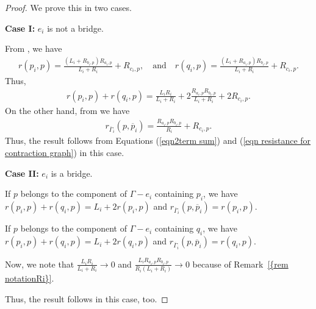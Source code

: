 \documentclass[12pt]{amsart}
\theoremstyle{example}
\theoremstyle{definition}
\theoremstyle{notation}
\begin{document}
\begin{proof}
We prove this in two cases.

\textbf{Case I:} $e_i$ is not a bridge.

From \cite[Section 2]{C4}, we have
\begin{equation}\label{eqn2term0}
\begin{split}
r(p_i,p)=\frac{({L_{i}}+R_{b_i,p})R_{a_i,p}}{{L_{i}}+{R_{i}}}+R_{c_i,p}, \quad
\text{and} \quad r(q_i,p)=\frac{({L_{i}}+R_{a_i,p})R_{b_i,p}}{{L_{i}}+{R_{i}}}+R_{c_i,p}.
\end{split}
\end{equation}
Thus,
\begin{equation}\label{eqn2term sum}
\begin{split}
r({p_{i}},p)+r({q_{i}},p) = \frac{{L_{i}} {R_{i}}}{{L_{i}}+{R_{i}}}+2 \frac{R_{a_i,p} R_{b_i,p}}{{L_{i}}+{R_{i}}}+2R_{c_i,p}.
\end{split}
\end{equation}
On the other hand, from \cite[Equation 17]{C7} we have
\begin{equation}\label{eqn resistance for contraction graph}
\begin{split}
r_{{{\overline{\Gamma}}}_i}(p,{\overline{p}_i}) = \frac{R_{a_{i},p} R_{b_{i},p}}{R_{i}} + R_{c_i,p}.
\end{split}
\end{equation}
Thus, the result follows from Equations (\ref{eqn2term sum}) and (\ref{eqn resistance for contraction graph}) in this case.

\textbf{Case II:} $e_i$ is a bridge.

If $p$ belongs to the component of ${\Gamma}-e_i$ containing ${p_{i}}$, we have $r({p_{i}},p)+r({q_{i}},p)={L_{i}}+2r({p_{i}},p)$ and $r_{{{\overline{\Gamma}}}_i}(p,{\overline{p}_i})=r({p_{i}},p)$.

If $p$ belongs to the component of ${\Gamma}-e_i$ containing ${q_{i}}$, we have $r({p_{i}},p)+r({q_{i}},p)={L_{i}}+2r({q_{i}},p)$ and $r_{{{\overline{\Gamma}}}_i}(p,{\overline{p}_i})=r({q_{i}},p)$.

Now, we note that $\frac{{L_{i}} {R_{i}}}{{L_{i}}+{R_{i}}} \longrightarrow 0$ and $\frac{{L_{i}} R_{a_{i},p} R_{b_{i},p}}{{R_{i}}({L_{i}}+{R_{i}})} \longrightarrow 0$ because of {Remark~\ref{{rem notationRi}}}.

Thus, the result follows in this case, too.

\end{proof}
\end{document}
